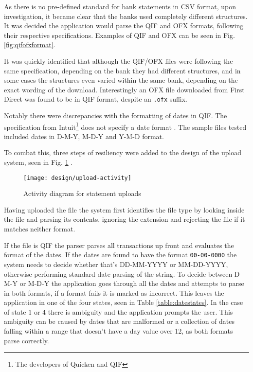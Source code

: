 As there is no pre-defined standard for bank statements in CSV format, upon investigation, it became clear that the banks used completely different structures. It was decided the application would parse the QIF and OFX formats, following their respective specifications. Examples of QIF and OFX can be seen in Fig. \ref{fig:qifofxformat}.

It was quickly identified that although the QIF/OFX files were following the same specification, depending on the bank they had different structures, and in some cases the structures even varied within the same bank, depending on the exact wording of the download. Interestingly an OFX file downloaded from First Direct was found to be in QIF format, despite an \lstinline$.ofx$ suffix.

Notably there were discrepancies with the formatting of dates in QIF. The specification from Intuit\footnote{The developers of Quicken and QIF} does not specify a date format \cite{quiken2010qif}. The sample files tested included dates in D-M-Y, M-D-Y and Y-M-D format.



To combat this, three steps of resiliency were added to the design of the upload system, seen in Fig. \ref{fig:fileupload} .

\begin{figure}[h]
    \centering
    \texttt{[image: design/upload-activity]}
    \caption{Activity diagram for statement uploads}
    \label{fig:fileupload}
    
    \begin{comment}
(start)->(Upload File)->(Identify File Format)-><a>[QIF]->(Identify Date Format)->(Parse Transactions),
<a>[OFX]->(Parse Transactions)->(Remove Duplicates)->(end),
<a>[Other]->(Reject Upload)
    \end{comment}
\end{figure}

Having uploaded the file the system first identifies the file type by looking inside the file and parsing its contents, ignoring the extension and rejecting the file if it matches neither format.

If the file is QIF the parser parses all transactions up front and evaluates the format of the dates. If the dates are found to have the format \lstinline$00-00-0000$ the system needs to decide whether that's DD-MM-YYYY or MM-DD-YYYY, otherwise performing standard date parsing of the string.
%
To decide between D-M-Y or M-D-Y the application goes through all the dates and attempts to parse in both formats, if a format fails it is marked as incorrect. This leaves the application in one of the four states, seen in Table \ref{table:datestates}. In the case of state 1 or 4 there is ambiguity and the application prompts the user. This ambiguity can be caused by dates that are malformed or a collection of dates falling within a range that doesn't have a day value over 12, as both formats parse correctly. 

